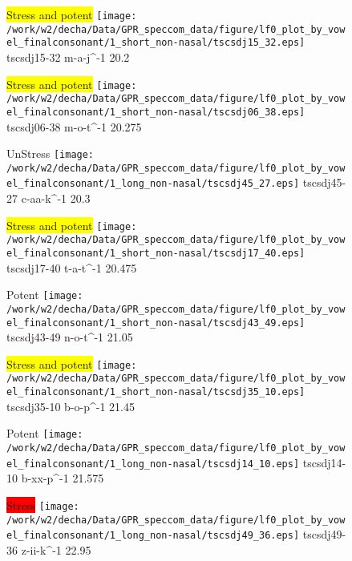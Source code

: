 \documentclass{article}
\begin{document}
\begin{figure}[t]
\begin{minipage}[b]{.24\textwidth}
\colorbox{yellow}{Stress and potent}
\centering
\texttt{[image: /work/w2/decha/Data/GPR\_speccom\_data/figure/lf0\_plot\_by\_vowel\_finalconsonant/1\_short\_non-nasal/tscsdj15\_32.eps]}
tscsdj15-32 m-a-j\textasciicircum-1 20.2
\end{minipage}
\begin{minipage}[b]{.24\textwidth}
\colorbox{yellow}{Stress and potent}
\centering
\texttt{[image: /work/w2/decha/Data/GPR\_speccom\_data/figure/lf0\_plot\_by\_vowel\_finalconsonant/1\_short\_non-nasal/tscsdj06\_38.eps]}
tscsdj06-38 m-o-t\textasciicircum-1 20.275
\end{minipage}
\begin{minipage}[b]{.24\textwidth}
UnStress
\centering
\texttt{[image: /work/w2/decha/Data/GPR\_speccom\_data/figure/lf0\_plot\_by\_vowel\_finalconsonant/1\_long\_non-nasal/tscsdj45\_27.eps]}
tscsdj45-27 c-aa-k\textasciicircum-1 20.3
\end{minipage}
\begin{minipage}[b]{.24\textwidth}
\colorbox{yellow}{Stress and potent}
\centering
\texttt{[image: /work/w2/decha/Data/GPR\_speccom\_data/figure/lf0\_plot\_by\_vowel\_finalconsonant/1\_short\_non-nasal/tscsdj17\_40.eps]}
tscsdj17-40 t-a-t\textasciicircum-1 20.475
\end{minipage}
\end{figure}

\begin{figure}[t]
\begin{minipage}[b]{.24\textwidth}
\colorbox{Apricot}{Potent}
\centering
\texttt{[image: /work/w2/decha/Data/GPR\_speccom\_data/figure/lf0\_plot\_by\_vowel\_finalconsonant/1\_short\_non-nasal/tscsdj43\_49.eps]}
tscsdj43-49 n-o-t\textasciicircum-1 21.05
\end{minipage}
\begin{minipage}[b]{.24\textwidth}
\colorbox{yellow}{Stress and potent}
\centering
\texttt{[image: /work/w2/decha/Data/GPR\_speccom\_data/figure/lf0\_plot\_by\_vowel\_finalconsonant/1\_short\_non-nasal/tscsdj35\_10.eps]}
tscsdj35-10 b-o-p\textasciicircum-1 21.45
\end{minipage}
\begin{minipage}[b]{.24\textwidth}
\colorbox{Apricot}{Potent}
\centering
\texttt{[image: /work/w2/decha/Data/GPR\_speccom\_data/figure/lf0\_plot\_by\_vowel\_finalconsonant/1\_long\_non-nasal/tscsdj14\_10.eps]}
tscsdj14-10 b-xx-p\textasciicircum-1 21.575
\end{minipage}
\begin{minipage}[b]{.24\textwidth}
\colorbox{red}{Stress}
\centering
\texttt{[image: /work/w2/decha/Data/GPR\_speccom\_data/figure/lf0\_plot\_by\_vowel\_finalconsonant/1\_long\_non-nasal/tscsdj49\_36.eps]}
tscsdj49-36 z-ii-k\textasciicircum-1 22.95
\end{minipage}
\end{figure}
\end{document}
